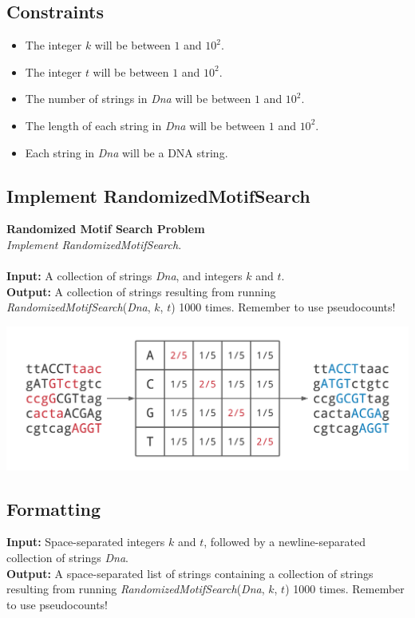 \documentclass{article}
\begin{document}
\subsection*{Constraints}
\begin{itemize}
    \item The integer $k$ will be between $1$ and $10^2$.
    \item The integer $t$ will be between $1$ and $10^2$.
    \item The number of strings in \emph{Dna} will be between $1$ and $10^2$.
    \item The length of each string in \emph{Dna} will be between $1$ and $10^2$.
    \item Each string in \emph{Dna} will be a DNA string.
\end{itemize}
\pagebreak
\subsection{Implement RandomizedMotifSearch}
\hline\vspace{5}
\noindent\textbf{Randomized Motif Search Problem}\\
\emph{Implement RandomizedMotifSearch}.\\ \\
\textbf{Input:} A collection of strings \emph{Dna}, and integers $k$ and $t$.\\
\textbf{Output:} A collection of strings resulting from running \emph{RandomizedMotifSearch}(\emph{Dna}, $k$, $t$) 1000 times. Remember to use pseudocounts!
\begin{center}
    \includegraphics[scale=0.2]{c2/logos/2F.png} 
\end{center}
\hline\vspace{5}

\subsection*{Formatting}
\textbf{Input:} Space-separated integers $k$ and $t$, followed by a newline-separated collection of strings \emph{Dna}.\\
\noindent\textbf{Output:} A space-separated list of strings containing a collection of strings resulting from running \emph{RandomizedMotifSearch}(\emph{Dna}, $k$, $t$) 1000 times. Remember to use pseudocounts!
\end{document}
